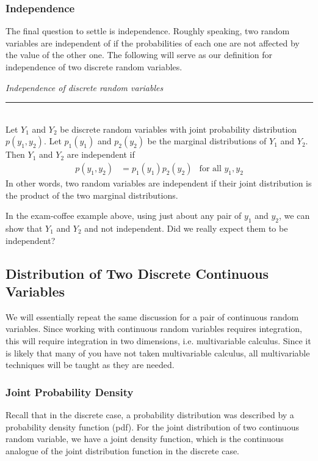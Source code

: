 \documentclass[notes.tex]{subfiles}
\begin{document}
\subsubsection{Independence}
The final question to settle is independence. Roughly speaking, two random variables are independent of if the probabilities of each one are not affected by the value of the other one. The following will serve as our definition for independence of two discrete random variables.

\begin{framed}
\emph{Independence of discrete random variables}\\
  \rule{\dimexpr{}\fboxrule}{.1pt} \\
Let $Y_1$ and $Y_2$ be discrete random variables with joint probability distribution $p(y_1, y_2)$. Let $p_1(y_1)$ and $p_2(y_2)$ be the marginal distributions of $Y_1$ and $Y_2$. Then $Y_1$ and $Y_2$ are independent if
\begin{align*}
p(y_1, y_2) &= p_1(y_1)p_2(y_2) & \text{for all }y_1, y_2
\end{align*}
In other words, two random variables are independent if their joint distribution is the product of the two marginal distributions.
\end{framed}

In the exam-coffee example above, using just about any pair of $y_1$ and $y_2$, we can show that $Y_1$ and $Y_2$ and not independent. Did we really expect them to be independent?

\subsection{Distribution of Two Discrete Continuous Variables}
We will essentially repeat the same discussion for a pair of continuous random variables. Since working with continuous random variables requires integration, this will require integration in two dimensions, i.e. multivariable calculus. Since it is likely that many of you have not taken multivariable calculus, all multivariable techniques will be taught as they are needed.

\subsubsection{Joint Probability Density}
Recall that in the discrete case, a probability distribution was described by a probability density function (pdf). For the joint distribution of two continuous random variable, we have a joint density function, which is the continuous analogue of the joint distribution function in the discrete case.
\end{document}
